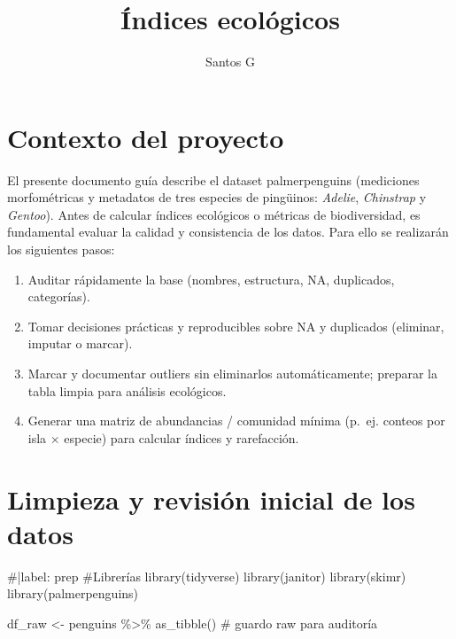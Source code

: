 \documentclass[
  spanish,
  11pt,
  a4paper,
  DIV=11,
  numbers=noendperiod]{scrartcl}
\title{Índices ecológicos}
\author{Santos G}
\date{}
\newenvironment{Shaded}{\begin{snugshade}}{\end{snugshade}}
\newcommand{\CommentTok}[1]{\textcolor[rgb]{0.37,0.37,0.37}{#1}}
\newcommand{\FunctionTok}[1]{\textcolor[rgb]{0.28,0.35,0.67}{#1}}
\newcommand{\NormalTok}[1]{\textcolor[rgb]{0.00,0.23,0.31}{#1}}
\newcommand{\OtherTok}[1]{\textcolor[rgb]{0.00,0.23,0.31}{#1}}
\newcommand{\SpecialCharTok}[1]{\textcolor[rgb]{0.37,0.37,0.37}{#1}}
\renewcommand*\contentsname{Tabla de contenidos}
\newcommand\contentsname{Tabla de contenidos}
\begin{document}
\maketitle

\renewcommand*\contentsname{Tabla de contenidos}
{
\hypersetup{linkcolor=}
\setcounter{tocdepth}{2}
\tableofcontents
}

\section{Contexto del proyecto}\label{contexto-del-proyecto}

El presente documento guía describe el dataset palmerpenguins
(mediciones morfométricas y metadatos de tres especies de pingüinos:
\emph{Adelie}, \emph{Chinstrap} y \emph{Gentoo}). Antes de calcular
índices ecológicos o métricas de biodiversidad, es fundamental evaluar
la calidad y consistencia de los datos. Para ello se realizarán los
siguientes pasos:

\begin{enumerate}
\def\labelenumi{\arabic{enumi}.}
\item
  Auditar rápidamente la base (nombres, estructura, NA, duplicados,
  categorías).
\item
  Tomar decisiones prácticas y reproducibles sobre NA y duplicados
  (eliminar, imputar o marcar).
\item
  Marcar y documentar outliers sin eliminarlos automáticamente; preparar
  la tabla limpia para análisis ecológicos.
\item
  Generar una matriz de abundancias / comunidad mínima (p.~ej. conteos
  por isla × especie) para calcular índices y rarefacción.
\end{enumerate}

\section{Limpieza y revisión inicial de los
datos}\label{limpieza-y-revisiuxf3n-inicial-de-los-datos}

\begin{Shaded}
\begin{Highlighting}[numbers=left,,]
\CommentTok{\#|label: prep}
\CommentTok{\#Librerías}
\FunctionTok{library}\NormalTok{(tidyverse)}
\FunctionTok{library}\NormalTok{(janitor)}
\FunctionTok{library}\NormalTok{(skimr)}
\FunctionTok{library}\NormalTok{(palmerpenguins)}

\NormalTok{df\_raw }\OtherTok{\textless{}{-}}\NormalTok{ penguins }\SpecialCharTok{\%\textgreater{}\%} \FunctionTok{as\_tibble}\NormalTok{() }\CommentTok{\# guardo raw para auditoría}
\end{Highlighting}
\end{Shaded}
\end{document}
